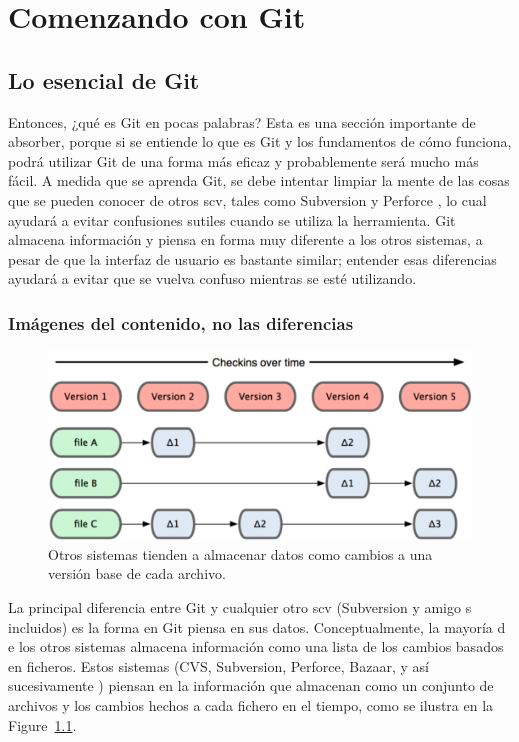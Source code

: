 \documentclass[12pt, spanish, oneside, onecolumn, a4paper]{report}
\begin{document}
\chapter{Comenzando con Git} 
\label{chap:gettingstarted} 
\section{Lo esencial de Git} 
\label{sec:gitbasics} Entonces, ¿qué es Git en pocas palabras? Esta es una sección importante de absorber, porque si se entiende lo que es Git y los fundamentos de cómo funciona, podrá utilizar Git de una forma más eficaz y probablemente será mucho más fácil. A medida que se aprenda Git, se debe intentar limpiar la mente de las cosas que se pueden conocer de otros 
\gls{scv}, tales como Subversion y Perforce , lo cual ayudará a evitar confusiones sutiles cuando se utiliza la herramienta. Git almacena información y piensa en forma muy diferente a los otros sistemas, a pesar de que la interfaz de usuario es bastante similar; entender esas diferencias ayudará a evitar que se vuelva confuso mientras se esté utilizando. 
\subsection{Imágenes del contenido, no las diferencias} 
\label{sec:snapshotsnotdifferences} 
\begin{figure} %
  \begin{center} 
    \includegraphics[width=.6\textwidth,keepaspectratio=true]{18333fig0104-tn.png} %
  \end{center} 
  \caption{Otros sistemas tienden a almacenar datos como cambios a una versión base de cada archivo.} 
  \label{otrosvcs} 
\end{figure} La principal diferencia entre Git y cualquier otro 
\gls{scv} (Subversion y amigo s incluidos) es la forma en Git piensa en sus datos. Conceptualmente, la mayoría d e los otros sistemas almacena información como una lista de los cambios basados en ficheros. Estos sistemas (CVS, Subversion, Perforce, Bazaar, y así sucesivamente ) piensan en la información que almacenan como un conjunto de archivos y los cambios hechos a cada fichero en el tiempo, como se ilustra en la Figure~\ref{otrosvcs}. 
\end{document}
